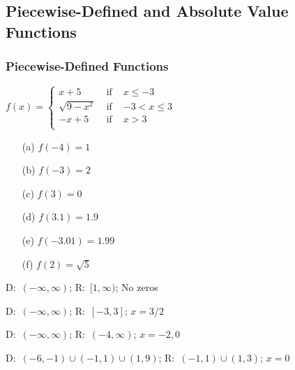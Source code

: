 \documentclass[12pt]{book}
\theoremstyle{definition}
\begin{document}
\subsection*{Piecewise-Defined and Absolute Value Functions}

\subsubsection{Piecewise-Defined Functions}


\begin{oddenumerate}
\item $f(x) = \left\{  \begin{array}{rcr} x + 5 & \mbox{ if } & x \leq -3 \\ \sqrt{9-x^2} & \mbox{ if } & -3 < x \leq 3 \\ -x+5 & \mbox{ if } & x > 3 \\ \end{array} \right.$
\normalsize
\begin{multicols}{3}
\begin{enumerate}
\item[(a)] $f(-4)=1$
\item[(b)]  $f(-3)=2$
\item[(c)]  $f(3)=0$
\end{enumerate}
\end{multicols}

\begin{multicols}{3}
\begin{enumerate}
\item[(d)]  $f(3.1)=1.9$
\item[(e)]  $f(-3.01)=1.99$
\item[(f)]  $f(2)=\sqrt{5}$
\end{enumerate}
\end{multicols}

\item D:~$(-\infty,\infty)$; R:~$[1,\infty)$; No zeros
\item D:~$(-\infty,\infty)$; R:~$[-3,3]$; $x=3/2$
\item D:~$(-\infty,\infty)$; R:~$(-4,\infty)$; $x=-2,0$
\item D:~$(-6,-1)\cup(-1,1)\cup(1,9)$; R:~$(-1,1)\cup(1,3)$; $x=0$
\end{oddenumerate}
\end{document}
